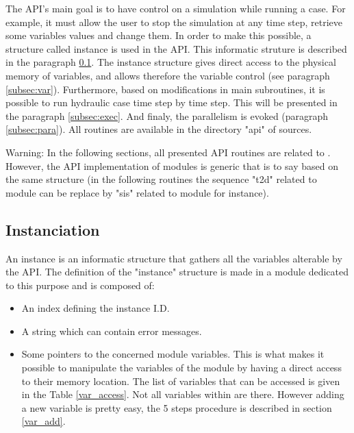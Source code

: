 The API’s main goal is to have control on a simulation while running a case.
For example, it must allow the user to stop the simulation at any time step,
retrieve some variables values and change them. In order to make this possible,
a \fortran structure called instance is used in the API. This informatic
struture is described in the paragraph \ref{subsec:instan}. The instance
structure gives direct access to the physical memory of variables, and allows
therefore the variable control (see paragraph \ref{subsec:var}). Furthermore,
based on modifications in \telemacsystem main subroutines, it is possible to
run hydraulic case time step by time step. This will be
presented in the paragraph \ref{subsec:exec}. And finaly, the parallelism is
evoked (paragraph \ref{subsec:para}).
All \fortran routines are available in the directory "api" of \telemacsystem
sources.

\begin{WarningBlock}{Warning:}
\centering
 In the following sections, all presented API routines are related to
 . However, the API implementation of \telemacsystem modules is
 generic that is to say based on the same structure (in the following routines
 the sequence "t2d" related to  module can be replace by "sis"
 related to \sisyphe module for instance).
\end{WarningBlock}

\subsection{Instanciation}
\label{subsec:instan}
An instance is an informatic structure that gathers all the variables alterable
by the API. The definition of the "instance" structure is made in a \fortran
module dedicated to this purpose and is composed of:

\begin{itemize}
\item An index defining the instance I.D.
\item A string which can contain error messages.
\item Some pointers to the concerned module variables. This is what makes it
  possible to manipulate the variables of the module by having a direct access
  to their memory location. The list of variables that can be accessed is given
  in the Table \ref{var_access}. Not all variables within  are
  there. However adding a new variable is pretty easy, the 5 steps procedure is
  described in section \ref{var_add}.
\end{itemize}

